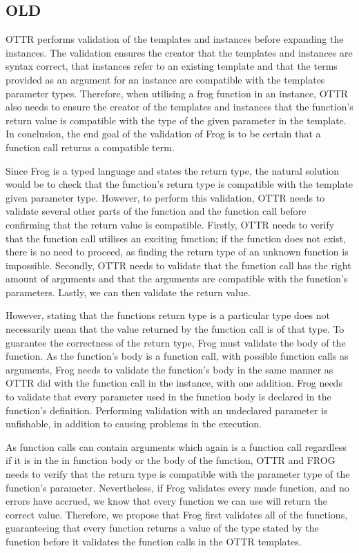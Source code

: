 \subsection{OLD}
OTTR performs validation of the templates and instances before expanding the instances. The validation ensures the creator that the templates and instances are syntax correct, that instances refer to an existing template and that the terms provided as an argument for an instance are compatible with the templates parameter types. Therefore, when utilising a frog function in an instance, OTTR also needs to ensure the creator of the templates and instances that the function's return value is compatible with the type of the given parameter in the template. In conclusion, the end goal of the validation of Frog is to be certain that a function call returns a compatible term. 

\para
Since Frog is a typed language and states the return type, the natural solution would be to check that the function's return type is compatible with the template given parameter type. However, to perform this validation, OTTR needs to validate several other parts of the function and the function call before confirming that the return value is compatible. Firstly, OTTR needs to verify that the function call utilises an exciting function; if the function does not exist, there is no need to proceed, as finding the return type of an unknown function is impossible. Secondly, OTTR needs to validate that the function call has the right amount of arguments and that the arguments are compatible with the function's parameters. Lastly, we can then validate the return value. 

\para
However, stating that the functions return type is a particular type does not necessarily mean that the value returned by the function call is of that type. To guarantee the correctness of the return type, Frog must validate the body of the function. As the function's body is a function call, with possible function calls as arguments, Frog needs to validate the function's body in the same manner as OTTR did with the function call in the instance, with one addition. Frog needs to validate that every parameter used in the function body is declared in the function's definition. Performing validation with an undeclared parameter is unfishable, in addition to causing problems in the execution. 

\para
As function calls can contain arguments which again is a function call regardless if it is in the in function body or the body of the function, OTTR and FROG needs to verify that the return type is compatible with the parameter type of the function's parameter. Nevertheless, if Frog validates every made function, and no errors have accrued, we know that every function we can use will return the correct value. Therefore, we propose that Frog first validates all of the functions, guaranteeing that every function returns a value of the type stated by the function before it validates the function calls in the OTTR templates. 

